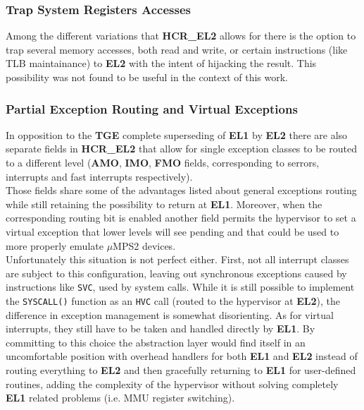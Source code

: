 \documentclass[12pt,a4paper,openright,twoside]{report}
\begin{document}
\subsubsection{Trap System Registers Accesses}
Among the different variations that \textbf{HCR\_EL2} allows for there is the 
option to trap several memory accesses, both read and write, or certain instructions
(like TLB maintainance) to \textbf{EL2} with the intent of hijacking the result.
This possibility was not found to be useful in the context of this work.

\subsubsection{Partial Exception Routing and Virtual Exceptions}
\label{hypervisor}
In opposition to the \textbf{TGE} complete superseding of \textbf{EL1} by
\textbf{EL2} there are also separate fields in \textbf{HCR\_EL2} that allow
for single exception classes to be routed to a different level (\textbf{AMO}, 
\textbf{IMO}, \textbf{FMO} fields, corresponding to serrors, interrupts and
fast interrupts respectively).\\
Those fields share some of the advantages listed about general exceptions routing
while still retaining the possibility to return at \textbf{EL1}.
Moreover, when the corresponding routing bit is enabled another field permits the
hypervisor to set a virtual exception that lower levels will see pending and that
could be used to more properly emulate $\mu$MPS2 devices.\\

Unfortunately this situation is not perfect either. First, not all interrupt classes are subject
to this configuration, leaving out synchronous exceptions caused by instructions
like {\tt SVC}, used by system calls. While it is still possible to implement
the {\tt SYSCALL()} function as an {\tt HVC} call (routed to the hypervisor at 
\textbf{EL2}), the difference in exception management is somewhat disorienting.
As for virtual interrupts, they still have to be taken and handled directly by 
\textbf{EL1}. By committing to this choice the abstraction layer would find itself in an 
uncomfortable position with overhead handlers for both \textbf{EL1} and \textbf{EL2}
instead of routing everything to \textbf{EL2} and then gracefully returning to 
\textbf{EL1} for user-defined routines, adding the complexity of the hypervisor
without solving completely \textbf{EL1} related problems (i.e. MMU register 
switching).
\end{document}
